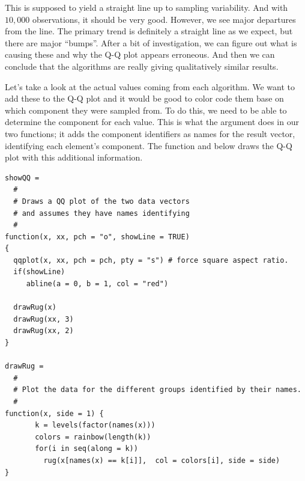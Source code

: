 \documentclass{article}
\begin{document}
\begin{description}
This is supposed to yield a straight line up to sampling variability.
And with $10,000$ observations, it should be very good.  However, we
see major departures from the line.  The primary trend is definitely a
straight line as we expect, but there are major ``bumps''.  After a
bit of investigation, we can figure out what is causing these and why
the Q-Q plot appears erroneous. And then we can conclude that the
algorithms are really giving qualitatively similar results.

Let's take a look at the actual values coming from each algorithm.  We
want to add these to the Q-Q plot and it would be good to color code
them base on which component they were sampled from.  To do this, we
need to be able to determine the component for each value.  This is
what the  argument does in our two functions;
it adds the component identifiers as names for the  result vector, 
identifying each element's component.
The function  and  below 
draws the Q-Q plot with this additional information.
\begin{verbatim}
showQQ =
  #
  # Draws a QQ plot of the two data vectors
  # and assumes they have names identifying
  #
function(x, xx, pch = "o", showLine = TRUE)
{  
  qqplot(x, xx, pch = pch, pty = "s") # force square aspect ratio.
  if(showLine)
     abline(a = 0, b = 1, col = "red")

  drawRug(x)
  drawRug(xx, 3)
  drawRug(xx, 2)
}

drawRug =
  #
  # Plot the data for the different groups identified by their names.
  #
function(x, side = 1) {
       k = levels(factor(names(x)))
       colors = rainbow(length(k))
       for(i in seq(along = k))
         rug(x[names(x) == k[i]],  col = colors[i], side = side)
}
\end{verbatim}


\end{description}
\end{document}
